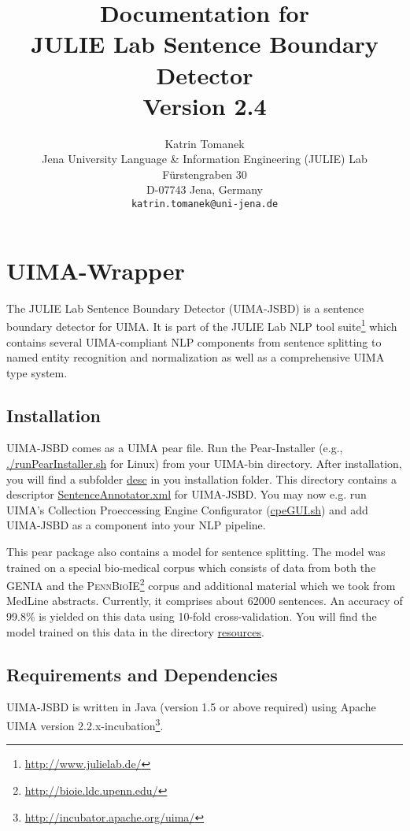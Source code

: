 \documentclass[11pt,a4paper,halfparskip]{scrartcl}
\title{\small{Documentation for}\\\huge JULIE Lab Sentence Boundary Detector\\\vspace{3mm}\small{Version 2.4}}
\author{\normalsize Katrin Tomanek\\
  \normalsize  Jena University Language \& Information Engineering (JULIE) Lab\\
  \normalsize F\"urstengraben 30 \\
  \normalsize D-07743 Jena, Germany\\
  {\normalsize \tt katrin.tomanek@uni-jena.de} }
\date{}
\begin{document}
\maketitle
\tableofcontents

\section{UIMA-Wrapper}



The JULIE Lab Sentence Boundary Detector (UIMA-JSBD) is a sentence
boundary detector for UIMA.  It is part of the JULIE Lab NLP tool
suite\footnote{\url{http://www.julielab.de/}} which contains several
UIMA-compliant NLP components from sentence splitting to named entity
recognition and normalization as well as a comprehensive UIMA type
system.

\subsection{Installation}

UIMA-JSBD comes as a UIMA pear file. Run the Pear-Installer (e.g.,
\url{./runPearInstaller.sh} for Linux) from your UIMA-bin directory.
After installation, you will find a subfolder \url{desc} in you
installation folder. This directory contains a descriptor
\url{SentenceAnnotator.xml} for UIMA-JSBD. You may now e.g. run UIMA's
Collection Proeccessing Engine Configurator (\url{cpeGUI.sh}) and add
UIMA-JSBD as a component into your NLP pipeline.

This pear package also contains a model for sentence splitting. The
model was trained on a special bio-medical corpus which consists of
data from both the GENIA \cite{Ohta2002} and the
\textsc{PennBioIE}\footnote{\url{http://bioie.ldc.upenn.edu/}} corpus
and additional material which we took from MedLine abstracts.
Currently, it comprises about 62000 sentences. An accuracy of 99.8\%
is yielded on this data using 10-fold cross-validation.  You will find
the model trained on this data in the directory \url{resources}.


\subsection{Requirements and Dependencies}

UIMA-JSBD is written in Java (version 1.5 or above required) using
Apache UIMA version
2.2.x-incubation\footnote{\url{http://incubator.apache.org/uima/}}.
\end{document}
